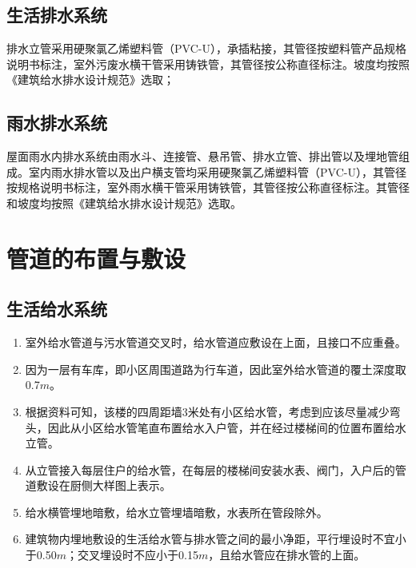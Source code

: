 \documentclass{gdutart}
\begin{document}
    \subsection{生活排水系统}
      排水立管采用硬聚氯乙烯塑料管（PVC-U），承插粘接，其管径按塑料管产品规格说明书标注，室外污废水横干管采用铸铁管，其管径按公称直径标注。坡度均按照《建筑给水排水设计规范》选取；

    \subsection{雨水排水系统}
      屋面雨水内排水系统由雨水斗、连接管、悬吊管、排水立管、排出管以及埋地管组成。室内雨水排水管以及出户横支管均采用硬聚氯乙烯塑料管（PVC-U），其管径按规格说明书标注，室外雨水横干管采用铸铁管，其管径按公称直径标注。其管径和坡度均按照《建筑给水排水设计规范》选取。

  \section{管道的布置与敷设}
    \subsection{生活给水系统}
      \begin{enumerate}
        \item 室外给水管道与污水管道交叉时，给水管道应敷设在上面，且接口不应重叠。
        \item 因为一层有车库，即小区周围道路为行车道，因此室外给水管道的覆土深度取0.7$m$。
        \item 根据资料可知，该楼的四周距墙3米处有小区给水管，考虑到应该尽量减少弯头，因此从小区给水管笔直布置给水入户管，并在经过楼梯间的位置布置给水立管。
        \item 从立管接入每层住户的给水管，在每层的楼梯间安装水表、阀门，入户后的管道敷设在厨侧大样图上表示。
        \item 给水横管埋地暗敷，给水立管埋墙暗敷，水表所在管段除外。
        \item 建筑物内埋地敷设的生活给水管与排水管之间的最小净距，平行埋设时不宜小于0.50$m$；交叉埋设时不应小于0.15$m$，且给水管应在排水管的上面。
      \end{enumerate}
\end{document}
